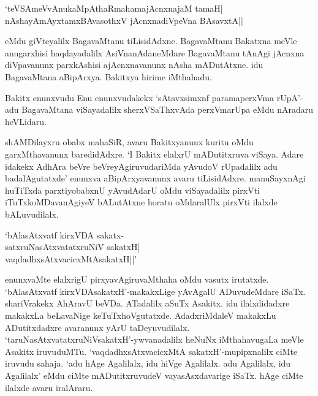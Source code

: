 \begin{shloka}
`teVSAmeVvAnukaMpAthaRmahamajAcnxnajaM tamaH|\\
nAshayAmAyxtamxBAvasothxV jAcnxnadiVpeVna BAsavxtA||
\end{shloka}

\noindent eMdu giVteyalilx BagavaMtanu tiLisidAdxne. BagavaMtanu Bakatxna meVle anugarxhisi haqdayadalilx AsiVnanAdaneMdare BagavaMtanu tAnAgi jAcnxna 
diVpavanunx parxkAshisi ajAcnxnavanunx nAsha mADutAtxne. idu BagavaMtana aBipArxya. Bakitxya hirime iMthahadu.

Bakitx enunxvudu Enu enunxvudakekx `sAtavxsimxnf paramaperxVma rUpA'-adu BagavaMtana viSayadalilx sherxVSaThxvAda perxVmarUpa eMdu nAradaru heVLidaru.

shAMDilayxru obabx mahaSiR, avaru Bakitxyanunx kuritu oMdu garxMthavanunx baredidAdxre. `I Bakitx elalxrU mADutitxruva viSaya. Adare idakekx AdhAra beVre 
beVreyAgiruvudariMda yAvudoV rUpadalilx adu badalAgutatxde' enunxva aBipArxyavanunx avaru tiLisidAdxre. manuSayxnAgi huTiTxda parxtiyobabxnU 
yAvudAdarU oMdu viSayadalilx pirxVti iTuTxkoMDavanAgiyeV bALutAtxne horatu oMdaralUlx pirxVti ilalxde bALuvudilalx.

\begin{shloka}
`bAlasAtxvatf kirxVDA sakatx-\\
satxruNasAtxvatatxruNiV sakatxH|\\
vaqdadhxsAtxvacicxMtAsakatxH||'
\end{shloka}

enunxvaMte elalxrigU pirxyavAgiruvaMthaha oMdu vasutx irutatxde. `bAlasAtxvatf kirxVDAsakatxH'-makakxLige yAvAgalU ADuvudeMdare iSaTx. shariVrakekx AhAravU beVDa. 
ATadalilx aSuTx Asakitx. idu ilalxdidadxre makakxLa beLavaNige keTuTxhoVgutatxde. AdadxriMdaleV makakxLu ADutitxdadxre avaranunx yArU taDeyuvudilalx. 
`taruNasAtxvatatxruNiVsakatxH'-ywvanadalilx heNuNx iMthahavugaLa meVle Asakitx iruvuduMTu. `vaqdadhxsAtxvacicxMtA sakatxH'-mupipxnalilx ciMte iruvudu sahaja. `adu hAge Agalilalx, idu hiVge Agalilalx. adu Agalilalx, idu Agalilalx' eMdu ciMte mADutitxruvudeV vayasAsxdavarige iSaTx. hAge ciMte ilalxde avaru iralAraru.

